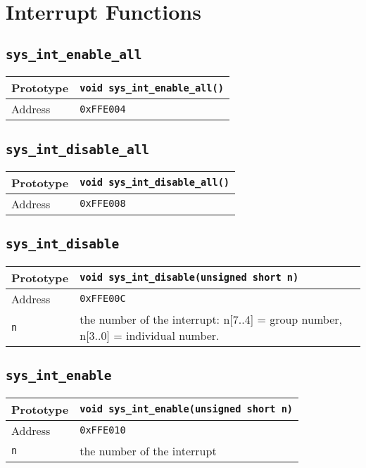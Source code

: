 \section{Interrupt Functions}

\subsection*{\texttt{sys\_int\_enable\_all}}
\begin{tabular}{|l||l|} \hline
Prototype & \lstinline!void sys_int_enable_all()! \\ \hline
Address & \texttt{0xFFE004} \\ \hline
\end{tabular}

\subsection*{\texttt{sys\_int\_disable\_all}}
\begin{tabular}{|l||l|} \hline
Prototype & \lstinline!void sys_int_disable_all()! \\ \hline
Address & \texttt{0xFFE008} \\ \hline
\end{tabular}

\subsection*{\texttt{sys\_int\_disable}}
\begin{tabular}{|l||l|} \hline
Prototype & \lstinline!void sys_int_disable(unsigned short n)! \\ \hline
Address & \texttt{0xFFE00C} \\ \hline
\lstinline!n! & the number of the interrupt: n[7..4] = group number, n[3..0] = individual number. \\ \hline
\end{tabular}

\subsection*{\texttt{sys\_int\_enable}}
\begin{tabular}{|l||l|} \hline
Prototype & \lstinline!void sys_int_enable(unsigned short n)! \\ \hline
Address & \texttt{0xFFE010} \\ \hline
\lstinline!n! & the number of the interrupt \\ \hline
\end{tabular}

